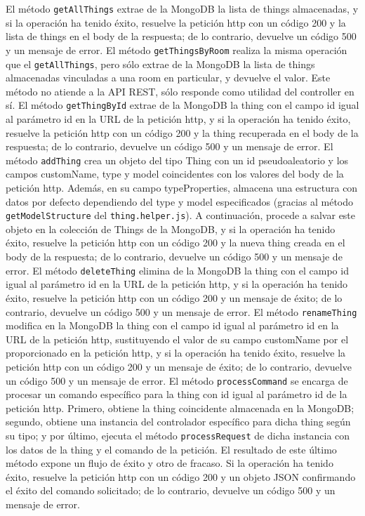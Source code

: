 El método \verb|getAllThings| extrae de la MongoDB la lista de things almacenadas, y si la operación ha tenido éxito, resuelve la petición http con un código 200 y la lista de things en el body de la respuesta; de lo contrario, devuelve un código 500 y un mensaje de error.
El método \verb|getThingsByRoom| realiza la misma operación que el \verb|getAllThings|, pero sólo extrae de la MongoDB la lista de things almacenadas vinculadas a una room en particular, y devuelve el valor. Este método no atiende a la API REST, sólo responde como utilidad del controller en sí.
El método \verb|getThingById| extrae de la MongoDB la thing con el campo id igual al parámetro id en la URL de la petición http, y si la operación ha tenido éxito, resuelve la petición http con un código 200 y la thing recuperada en el body de la respuesta; de lo contrario, devuelve un código 500 y un mensaje de error.
El método \verb|addThing| crea un objeto del tipo Thing con un id pseudoaleatorio y los campos customName, type y model coincidentes con los valores del body de la petición http. Además, en su campo typeProperties, almacena una estructura con datos por defecto dependiendo del type y model especificados (gracias al método \verb|getModelStructure| del \verb|thing.helper.js|). A continuación, procede a salvar este objeto en la colección de Things de la MongoDB, y si la operación ha tenido éxito, resuelve la petición http con un código 200 y la nueva thing creada en el body de la respuesta; de lo contrario, devuelve un código 500 y un mensaje de error.
El método \verb|deleteThing| elimina de la MongoDB la thing con el campo id igual al parámetro id en la URL de la petición http, y si la operación ha tenido éxito, resuelve la petición http con un código 200 y un mensaje de éxito; de lo contrario, devuelve un código 500 y un mensaje de error.
El método \verb|renameThing| modifica en la MongoDB la thing con el campo id igual al parámetro id en la URL de la petición http, sustituyendo el valor de su campo customName por el proporcionado en la petición http, y si la operación ha tenido éxito, resuelve la petición http con un código 200 y un mensaje de éxito; de lo contrario, devuelve un código 500 y un mensaje de error.
El método \verb|processCommand| se encarga de procesar un comando específico para la thing con id igual al parámetro id de la petición http. Primero, obtiene la thing coincidente almacenada en la MongoDB; segundo, obtiene una instancia del controlador específico para dicha thing según su tipo; y por último, ejecuta el método \verb|processRequest| de dicha instancia con los datos de la thing y el comando de la petición. El resultado de este último método expone un flujo de éxito y otro de fracaso. Si la operación ha tenido éxito, resuelve la petición http con un código 200 y un objeto JSON confirmando el éxito del comando solicitado; de lo contrario, devuelve un código 500 y un mensaje de error.

